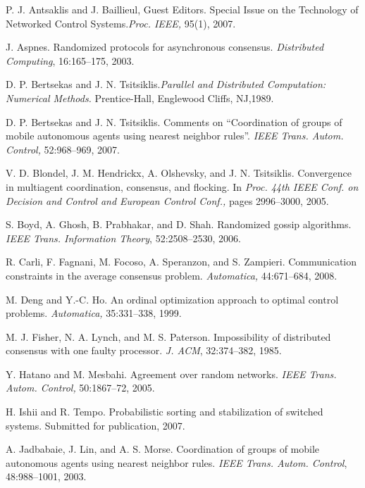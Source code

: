 \documentclass[12pt]{article}
\begin{document}
	
	
	\begin{thebibliography}{30}
		
		 P. J. Antsaklis and J. Baillieul, Guest Editors. Special Issue on the Technology of Networked Control Systems.\textit{Proc. IEEE,} 95(1), 2007.
		
		
		 J. Aspnes. Randomized protocols for asynchronous consensus. \textit{Distributed Computing}, 16:165–175, 2003.
		
		
		 D. P. Bertsekas and J. N. Tsitsiklis.\textit{Parallel and Distributed Computation: Numerical Methods.} Prentice-Hall, Englewood Cliffs, NJ,1989.
		
		
		 D. P. Bertsekas and J. N. Tsitsiklis. Comments on “Coordination of groups of mobile autonomous agents using nearest neighbor rules”. \textit{IEEE Trans. Autom. Control,} 52:968–969, 2007.
		
		
		 V. D. Blondel, J. M. Hendrickx, A. Olshevsky, and J. N. Tsitsiklis. Convergence in multiagent coordination, consensus, and flocking. In \textit{Proc. 44th IEEE Conf. on Decision and Control and European Control Conf.,} pages 2996–3000, 2005.
		
		
		 S. Boyd, A. Ghosh, B. Prabhakar, and D. Shah. Randomized gossip algorithms. \textit{IEEE Trans. Information Theory}, 52:2508–2530, 2006.
		
		
		 R. Carli, F. Fagnani, M. Focoso, A. Speranzon, and S. Zampieri. Communication constraints in the average consensus problem. \textit{Automatica,} 44:671–684, 2008.
		
		
		 M. Deng and Y.-C. Ho. An ordinal optimization approach to optimal control problems. \textit{ Automatica,} 35:331–338, 1999.
		
		
		 M. J. Fisher, N. A. Lynch, and M. S. Paterson. Impossibility of distributed consensus with one faulty processor. \textit{J. ACM}, 32:374–382, 1985.
		
		
		 Y. Hatano and M. Mesbahi. Agreement over random networks. \textit{IEEE Trans. Autom. Control,} 50:1867–72, 2005.
		
		
		 H. Ishii and R. Tempo. Probabilistic sorting and stabilization of switched systems. Submitted for publication, 2007.
		
		
		 A. Jadbabaie, J. Lin, and A. S. Morse. Coordination of groups of mobile autonomous agents using nearest neighbor rules. \textit{IEEE Trans. Autom. Control}, 48:988–1001, 2003.
		

\end{thebibliography}
\end{document}
